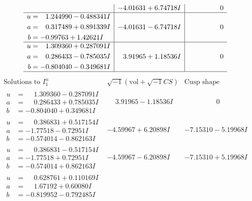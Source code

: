 \documentclass[1p]{elsarticle_modified}
\theoremstyle{definition}
\newcommand{\I}{\sqrt{-1}}
\begin{document}
$$\begin{array}{c|c|c}
 & -4.01631 + 6.74718 I & \phantom{-0.000000 } 0 \\ \hline\begin{aligned}
u &= \phantom{-}1.244990 - 0.488341 I \\
a &= \phantom{-}0.317489 + 0.891339 I \\
b &= -0.99763 + 1.42621 I\end{aligned}
 & -4.01631 - 6.74718 I & \phantom{-0.000000 } 0 \\ \hline\begin{aligned}
u &= \phantom{-}1.309360 + 0.287091 I \\
a &= \phantom{-}0.286433 - 0.785035 I \\
b &= -0.804040 - 0.349681 I\end{aligned}
 & \phantom{-}3.91965 + 1.18536 I & \phantom{-0.000000 } 0\\
 \hline 
 \end{array}$$\newpage$$\begin{array}{c|c|c}  
\text{Solutions to }I^u_{1}& \I (\text{vol} + \sqrt{-1}CS) & \text{Cusp shape}\\
 \hline 
\begin{aligned}
u &= \phantom{-}1.309360 - 0.287091 I \\
a &= \phantom{-}0.286433 + 0.785035 I \\
b &= -0.804040 + 0.349681 I\end{aligned}
 & \phantom{-}3.91965 - 1.18536 I & \phantom{-0.000000 } 0 \\ \hline\begin{aligned}
u &= \phantom{-}0.386831 + 0.517154 I \\
a &= -1.77518 - 0.72951 I \\
b &= -0.574014 - 0.862163 I\end{aligned}
 & -4.59967 + 6.20898 I & -7.15310 - 5.19968 I \\ \hline\begin{aligned}
u &= \phantom{-}0.386831 - 0.517154 I \\
a &= -1.77518 + 0.72951 I \\
b &= -0.574014 + 0.862163 I\end{aligned}
 & -4.59967 - 6.20898 I & -7.15310 + 5.19968 I \\ \hline\begin{aligned}
u &= \phantom{-}0.628761 + 0.110169 I \\
a &= \phantom{-}1.67192 + 0.60080 I \\
b &= -0.819952 - 0.792485 I\end{aligned}

\end{array}$$
\end{document}
